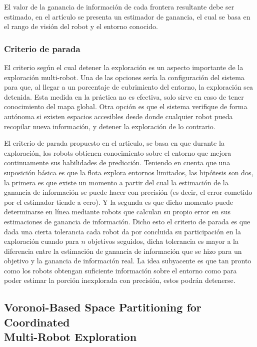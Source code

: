 El valor de la ganancia de información de cada frontera resultante debe ser estimado, en el artículo se presenta un estimador de ganancia, el cual se basa en el rango de visión del robot y el entorno conocido. 

\subsubsection{Criterio de parada}

El criterio según el cual detener la exploración es un aspecto importante de la exploración multi-robot. Una de las opciones sería la configuración del sistema para que, al llegar a un porcentaje de cubrimiento del entorno, la exploración sea detenida. Esta medida en la práctica no es efectiva, solo sirve en caso de tener conocimiento del mapa global. Otra opción es que el sistema verifique de forma autónoma si existen espacios accesibles desde donde cualquier robot pueda recopilar nueva información, y detener la exploración de lo contrario.

El criterio de parada propuesto en el articulo, se basa en que durante la exploración, los robots obtienen conocimiento sobre el entorno que mejora continuamente sus habilidades de predicción. Teniendo en cuenta que una suposición básica es que la flota explora entornos limitados, las hipótesis son dos, la primera es que existe un momento a partir del cual la estimación de la ganancia de información se puede hacer con precisión (es decir, el error cometido por el estimador tiende a cero). Y la segunda es que dicho momento puede determinarse en línea mediante robots que calculan su propio error en sus estimaciones de ganancia de información. Dicho esto el criterio de parada es que dada una cierta tolerancia cada robot da por concluida su participación en la exploración cuando para $n$ objetivos seguidos, dicha tolerancia es mayor a la diferencia entre la estimación de ganancia de información que se hizo para un objetivo y la ganancia de información real. La idea subyacente es que tan pronto como los robots obtengan suficiente información sobre el entorno como para poder estimar la porción inexplorada con precisión, estos podrán detenerse.

\subsection[Voronoi-Based Space Partitioning for Coordinated Multi-Robot Exploration]{Voronoi-Based Space Partitioning for Coordinated\\ Multi-Robot Exploration} \cite{wu2007voronoi}

